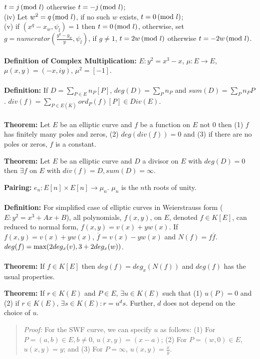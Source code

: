 $t= j \thinspace \textnormal{(mod } l \textnormal{)}$ otherwise $t= -j \thinspace \textnormal{(mod } l \textnormal{)}$; \\
\jt \jt
(iv) Let $w^2=q \thinspace \textnormal{(mod } l \textnormal{)}$, if no such $w$ exists, 
$t=0 \thinspace \textnormal{(mod } l \textnormal{)}$;\\
\jt \jt
(v) if $(x^q - x_w, \psi_l )=1$ then 
$t=0 \thinspace \textnormal{(mod } l \textnormal{)}$, otherwise, set $g= numerator({\frac {y^q - y_w} y}, \psi_l)$, if
$g \ne 1$, $t= 2w \thinspace \textnormal{(mod } l \textnormal{)}$ otherwise 
$t= -2w \thinspace \textnormal{(mod } l \textnormal{)}$.
\\
\\
{\bf Definition of Complex Multiplication:}
$E: y^2= x^3 - x$, $\mu: E \rightarrow E$, $\mu(x,y)= (-x, iy)$, 
$\mu^2= [-1]$.
\\
\\
{\bf Definition:} 
If $D= \sum_{P \in E} n_P [P]$, $deg(D)= \sum_P n_P$ and $sum(D)= \sum_P n_P P$.
$div(f)= \sum_{P \in E({\overline K})} ord_P(f) [P] \in Div(E)$.
\\
\\
{\bf Theorem:}  Let $E$ be an elliptic curve and $f$ be a function on $E$ not $0$ then 
(1) $f$ has finitely many poles and zeros, (2) $deg(div(f))=0$ and (3) if there are no
poles or zeros, $f$ is a constant.
\begin{quote}
\end{quote}
{\bf Theorem:}  Let $E$ be an elliptic curve and $D$ a divisor on $E$ with
$deg(D)=0$ then $\exists f$ on $E$ with $div(f)=D, sum(D)= \infty$.
\begin{quote}
\end{quote}
{\bf Pairing:} $e_n: E[n] \times E[n] \rightarrow \mu_n$.  $\mu_n$ is the $n$th roots of
unity.
\\
\\
{\bf Definition:}
For simplified case of elliptic curves in Weierstrauss form ($E: y^2=x^3+Ax+B$),
all polynomials, $f(x,y)$, on $E$, denoted $f \in K[E]$, 
can reduced to normal form, 
$f(x,y)= v(x)+yw(x)$.  If
$f(x,y)= v(x)+yw(x)$, ${\overline f}= v(x)-y w(x)$ and $N(f)= f {\overline f}$.
$deg(f)= \textnormal{max}(2 deg_x(v), 3+2deg_x(w))$.
\\
\\
{\bf Theorem:} 
If $f \in K[E]$ then $deg(f)= deg_x(N(f))$ and $deg(f)$ has the usual properties.
\begin{quote}
\end{quote}
{\bf Theorem:} 
If $r \in K(E)$ and $P \in E$, $\exists u \in K(E)$ such that (1) $u(P)=0$ and
(2) if $r \in K(E)$, $\exists s \in K(E): r=u^ds$.  Further, $d$ does not
depend on the choice of $u$.
\begin{quote}
\emph{Proof:}
For the SWF curve, we can specify $u$ as follows: 
(1) For $P=(a,b) \in E, b \ne 0$, $u(x,y)= (x-a)$;
(2) For $P=(w,0) \in E$, $u(x,y)= y$; and
(3) For $P= \infty$, $u(x,y)= {\frac x y}$.
\end{quote}
